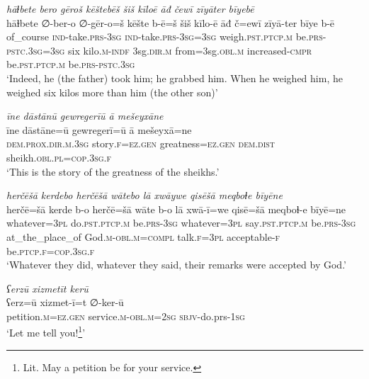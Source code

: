 \ea \label{ZB.57}
\textit{hāɫbete bero gēroš kēštebēš šiš kīloē āđ čewī zīyāter bīyebē} \\ 
\gll hāɫbete ∅-ber-o ∅-gēr-o=š kēšte b-ē=š šiš kīlo-ē āđ č=ewī zīyā-ter bīye b-ē \\ 
 of\_course \textsc{ind-}take\textsc{.prs}\textsc{-3sg} \textsc{ind-}take\textsc{.prs}\textsc{-3sg}\textsc{=3sg} weigh\textsc{.pst}\textsc{.ptcp}\textsc{.m} be\textsc{.prs}\textsc{-pstc}\textsc{.3sg}\textsc{=3sg} six kilo\textsc{.m}\textsc{-indf} 3sg\textsc{.dir}\textsc{.m} from=3sg\textsc{.obl}\textsc{.m} increased\textsc{-cmpr} be\textsc{.pst}\textsc{.ptcp}\textsc{.m} be\textsc{.prs}\textsc{-pstc}\textsc{.3sg} \\ 
\glt `Indeed, he (the father) took him; he grabbed him. When he weighed him, he weighed six kilos more than him (the other son)'
\z 
 
\ea \label{ZB.58}
\textit{īne dāstānū gewregerīū ā mešeyxāne} \\ 
\gll īne dāstāne=ū gewregerī=ū ā mešeyxā=ne \\ 
 \textsc{dem.prox}\textsc{.dir}\textsc{.m}\textsc{.3sg} story\textsc{.f}\textsc{\textsc{=ez.gen}} greatness\textsc{\textsc{=ez.gen}} \textsc{dem.dist} sheikh\textsc{.obl}\textsc{.pl}\textsc{=cop}\textsc{.3sg}\textsc{.f} \\ 
\glt `This is the story of the greatness of the sheikhs.'
\z 
 
\ea \label{ZB.59}
\textit{herčēšā kerdebo herčēšā wātebo lā xwāywe qisēšā meqboɫe bīyēne} \\ 
\gll herčē=šā kerde b-o herčē=šā wāte b-o lā xwā-ī=we qisē=šā meqboɫ-e bīyē=ne \\ 
 whatever\textsc{=3pl} do\textsc{.pst}\textsc{.ptcp}\textsc{.m} be\textsc{.prs}\textsc{-3sg} whatever\textsc{=3pl} say\textsc{.pst}\textsc{.ptcp}\textsc{.m} be\textsc{.prs}\textsc{-3sg} at\_the\_place\_of God\textsc{.m}\textsc{-obl}\textsc{.m}\textsc{=compl} talk\textsc{.f}\textsc{=3pl} acceptable\textsc{-f} be\textsc{.ptcp}\textsc{.f}\textsc{=cop}\textsc{.3sg}\textsc{.f} \\ 
\glt `Whatever they did, whatever they said, their remarks were accepted by God.'
\z 
 
\ea \label{ZQ.1}
\textit{ʕerzū xizmetīt kerū} \\ 
\gll ʕerz=ū xizmet-ī=t ∅-ker-ū \\ 
 petition\textsc{.m}\textsc{=ez.gen} service\textsc{.m}\textsc{-obl}\textsc{.m}\textsc{=\textsc{2sg}} \textsc{sbjv-}do.prs\textsc{-\textsc{1sg}} \\ 
\glt `Let me tell you!\footnote{Lit. May a petition be for your service.}'
\z 
 

